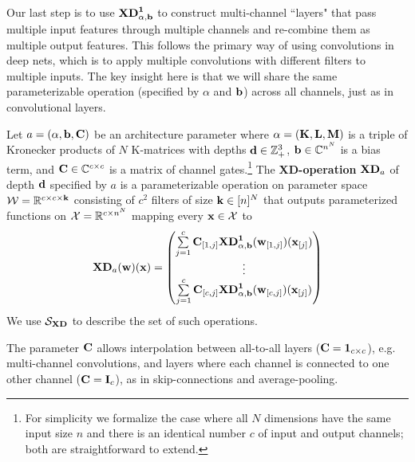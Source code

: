 Our last step is to use $\mathbf{XD}_{\alpha,\mathbf{b}}^\mathbf 1$ to construct multi-channel ``layers" that pass multiple input features through multiple channels and re-combine them as multiple output features.
This follows the primary way of using convolutions in deep nets, which is to apply multiple convolutions with different filters to multiple inputs.
The key insight here is that we will share the same parameterizable operation (specified by $\alpha$ and $\mathbf{b}$) across all channels, just as in convolutional layers.
\begin{Def}\label{def:xd}
	Let $a=(\alpha,\mathbf{b},\mathbf{C})$ be an architecture parameter where $\alpha=(\mathbf{K},\mathbf{L},\mathbf{M})$ is a triple of Kronecker products of $N$ K-matrices with depths $\mathbf{d}\in\mathbb Z_+^3$, $\mathbf{b}\in\mathbb C^{n^N}$ is a bias term, and $\mathbf{C}\in\mathbb C^{c\times c}$ is a matrix of channel gates.\footnote{For simplicity we formalize the case where all $N$ dimensions have the same input size $n$ and there is an identical number $c$ of input and output channels; both are straightforward to extend.}
	The {\bf XD-operation} $\mathbf{XD}_a$ of depth $\mathbf{d}$ specified by $a$ is a parameterizable operation on parameter space $\mathcal W=\mathbb R^{c\times c\times\mathbf{k}}$ consisting of $c^2$ filters of size $\mathbf{k}\in[n]^N$ that outputs parameterized functions on $\mathcal X=\mathbb R^{c\times n^N}$ mapping every $\mathbf{x}\in\mathcal X$ to\vspace{-5pt}
	\begin{equation}
	\mathbf{XD}_a(\mathbf{w})(\mathbf{x})=
	\begin{pmatrix}
	\sum\limits_{j=1}^c\mathbf{C}_{[1,j]}\mathbf{XD}_{\alpha,\mathbf{b}}^\mathbf 1(\mathbf{w}_{[1,j]})(\mathbf{x}_{[j]})\\
	\vdots\\
	\sum\limits_{j=1}^c\mathbf{C}_{[c,j]}\mathbf{XD}_{\alpha,\mathbf{b}}^\mathbf 1(\mathbf{w}_{[c,j]})(\mathbf{x}_{[j]})
	\end{pmatrix}
	\end{equation}
	We use $\mathcal S_{\mathbf{XD}}$ to describe the set of such operations.
\end{Def}
The parameter $\mathbf{C}$ allows interpolation between all-to-all layers ($\mathbf{C}=\mathbf 1_{c\times c}$), e.g. multi-channel convolutions, and layers where each channel is connected to one other channel ($\mathbf{C}=\mathbf{I}_c$), as in skip-connections and average-pooling.

